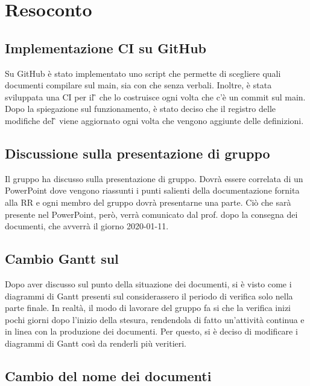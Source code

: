 \newpage


\section{Resoconto}

\subsection{Implementazione CI su GitHub}

Su GitHub è stato implementato uno script che permette di scegliere quali documenti compilare sul main, sia con che senza verbali. Inoltre, è stata sviluppata una CI per il \G{} che lo costruisce ogni volta che c'è un commit sul main. Dopo la spiegazione sul funzionamento, è stato deciso che il registro delle modifiche del \G{} viene aggiornato ogni volta che vengono aggiunte delle definizioni.

\subsection{Discussione sulla presentazione di gruppo}

Il gruppo ha discusso sulla presentazione di gruppo. Dovrà essere correlata di un PowerPoint dove vengono riassunti i punti salienti della documentazione fornita alla RR e ogni membro del gruppo dovrà presentarne una parte. Ciò che sarà presente nel PowerPoint, però, verrà comunicato dal prof. \textit{\Tullio} dopo la consegna dei documenti, che avverrà il giorno 2020-01-11.

\subsection{Cambio Gantt sul \PdP{} }

Dopo aver discusso sul punto della situazione dei documenti, si è visto come i diagrammi di Gantt presenti sul \PdP{} considerassero il periodo di verifica solo nella parte finale. In realtà, il modo di lavorare del gruppo fa si che la verifica inizi pochi giorni dopo l'inizio della stesura, rendendola di fatto un'attività continua e in linea con la produzione dei documenti. Per questo, si è deciso di modificare i diagrammi di Gantt così da renderli più veritieri.

\subsection{Cambio del nome dei documenti}

